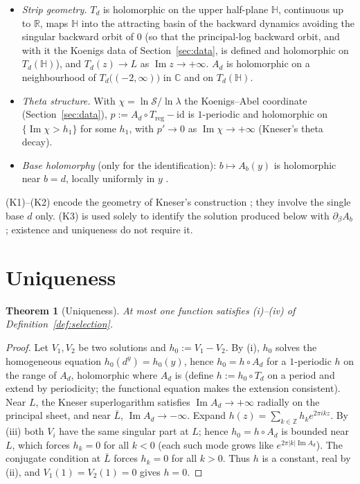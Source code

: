 \documentclass[11pt]{article}
\newtheorem{theorem}{Theorem}
\newcommand{\R}{\mathbb{R}}
\newcommand{\C}{\mathbb{C}}
\newcommand{\Z}{\mathbb{Z}}
\newcommand{\Hup}{\mathbb{H}}
\newcommand{\Sk}{\mathcal S}
\begin{document}
\begin{itemize}
\item[(K1)] \emph{Strip geometry.}  $T_d$ is holomorphic on the upper
half-plane $\Hup$, continuous up to $\R$, maps $\Hup$ into the attracting
basin of the backward dynamics avoiding the singular backward orbit of
$0$ (so that the principal-log backward orbit, and with it the Koenigs
data of Section~\ref{sec:data}, is defined and holomorphic on
$T_d(\Hup)$), and $T_d(z)\to L$ as $\operatorname{Im}z\to+\infty$.
$A_d$ is holomorphic on a neighbourhood of $T_d\bigl((-2,\infty)\bigr)$
in $\C$ and on $T_d(\Hup)$.
\item[(K2)] \emph{Theta structure.}  With $\chi=\ln\Sk/\ln\lambda$ the
Koenigs--Abel coordinate (Section~\ref{sec:data}), $p:=A_d\circ
T_{\mathrm{reg}}-\mathrm{id}$ is $1$-periodic and holomorphic on
$\{\operatorname{Im}\chi>h_1\}$ for some $h_1$, with $p'\to0$ as
$\operatorname{Im}\chi\to+\infty$ (Kneser's theta decay).
\item[(K3)] \emph{Base holomorphy} (only for the identification):
$b\mapsto A_b(y)$ is holomorphic near $b=d$, locally uniformly in $y$
\cite{p19}.
\end{itemize}

(K1)--(K2) encode the geometry of Kneser's construction \cite{kneser};
they involve the single base $d$ only.  (K3) is used solely to identify
the solution produced below with $\partial_\beta A_b$; existence and
uniqueness do not require it.

\section{Uniqueness}

\begin{theorem}[Uniqueness]\label{thm:unique}
At most one function satisfies (i)--(iv) of
Definition~\ref{def:selection}.
\end{theorem}

\begin{proof}
Let $V_1,V_2$ be two solutions and $h_0:=V_1-V_2$.  By (i), $h_0$ solves
the homogeneous equation $h_0(d^y)=h_0(y)$, hence $h_0=h\circ A_d$ for a
$1$-periodic $h$ on the range of $A_d$, holomorphic where $A_d$ is (define
$h:=h_0\circ T_d$ on a period and extend by periodicity; the functional
equation makes the extension consistent).  Near $L$, the Kneser
superlogarithm satisfies $\operatorname{Im}A_d\to+\infty$ radially on the
principal sheet, and near $\bar L$, $\operatorname{Im}A_d\to-\infty$.
Expand $h(z)=\sum_{k\in\Z}h_k e^{2\pi ikz}$.  By (iii) both $V_i$ have the
same singular part at $L$; hence $h_0=h\circ A_d$ is bounded near $L$,
which forces $h_k=0$ for all $k<0$ (each such mode grows like
$e^{2\pi|k|\operatorname{Im}A_d}$).  The conjugate condition at $\bar L$
forces $h_k=0$ for all $k>0$.  Thus $h$ is a constant, real by (ii), and
$V_1(1)=V_2(1)=0$ gives $h=0$.
\end{proof}
\end{document}
